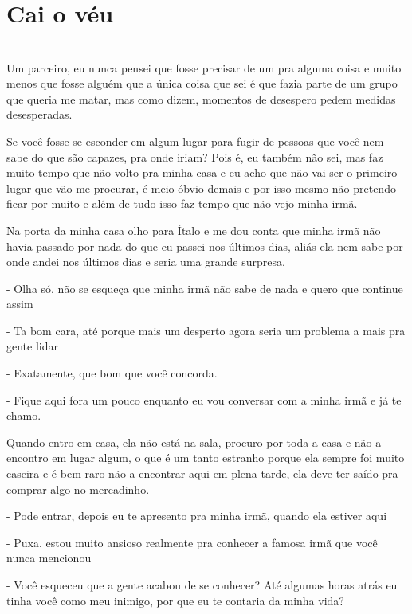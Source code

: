 
\newpage


\ifdefined\useChapters
\chapter{Cai o véu}

\else
\chapter{}
\fi
Um parceiro, eu nunca pensei que fosse precisar de um pra alguma coisa e muito menos que fosse alguém que a única coisa que sei é que fazia parte de um grupo que queria me matar, mas como dizem, momentos de desespero pedem medidas desesperadas.

Se você fosse se esconder em algum lugar para fugir de pessoas que você nem sabe do que são capazes, pra onde iriam? Pois é, eu também não sei, mas faz muito tempo que não volto pra minha casa e eu acho que não vai ser o primeiro lugar que vão me procurar, é meio óbvio demais e por isso mesmo não pretendo ficar por muito e além de tudo isso faz tempo que não vejo minha irmã.

Na porta da minha casa olho para Ítalo e me dou conta que minha irmã não havia passado por nada do que eu passei nos últimos dias, aliás ela nem sabe por onde andei nos últimos dias e seria uma grande surpresa.

- Olha só, não se esqueça que minha irmã não sabe de nada e quero que continue assim

- Ta bom cara, até porque mais um desperto agora seria um problema a mais pra gente lidar

- Exatamente, que bom que você concorda.

- Fique aqui fora um pouco enquanto eu vou conversar com a minha irmã e já te chamo.

Quando entro em casa, ela não está na sala, procuro por toda a casa e não a encontro em lugar algum, o que é um tanto estranho porque ela sempre foi muito caseira e é bem raro não a encontrar aqui em plena tarde, ela deve ter saído pra comprar algo no mercadinho.

- Pode entrar, depois eu te apresento pra minha irmã, quando ela estiver aqui

- Puxa, estou muito ansioso realmente pra conhecer a famosa irmã que você nunca mencionou

- Você esqueceu que a gente acabou de se conhecer? Até algumas horas atrás eu tinha você como meu inimigo, por que eu te contaria da minha vida?

